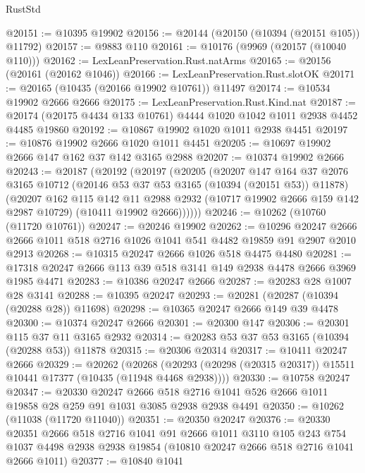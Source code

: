 \begin{lexlean}{RustStd}
\begin{coremodule}
@20151 := @10395 @19902
@20156 := @20144 (@20150 (@10394 (@20151 @105)) @11792)
@20157 := @9883 @110
@20161 := @10176 (@9969 (@20157 (@10040 @110)))
@20162 := LexLeanPreservation.Rust.natArms
@20165 := @20156 (@20161 (@20162 @1046))
@20166 := LexLeanPreservation.Rust.slotOK
@20171 := @20165 (@10435 (@20166 @19902 @10761)) @11497
@20174 := @10534 @19902 @2666 @2666
@20175 := LexLeanPreservation.Rust.Kind.nat
@20187 := @20174 (@20175 @4434 @133 @10761) @4444 @1020 @1042 @1011 @2938 @4452 @4485 @19860
@20192 := @10867 @19902 @1020 @1011 @2938 @4451
@20197 := @10876 @19902 @2666 @1020 @1011 @4451
@20205 := @10697 @19902 @2666 @147 @162 @37 @142 @3165 @2988
@20207 := @10374 @19902 @2666
@20243 := @20187
    (@20192
      (@20197
        (@20205
          (@20207
            @147
            @164
            @37
            @2076
            @3165
            @10712
            (@20146 @53 @37 @53 @3165 (@10394 (@20151 @53)) @11878)
            (@20207
              @162
              @115
              @142
              @11
              @2988
              @2932
              (@10717 @19902 @2666 @159 @142 @2987 @10729)
              (@10411 @19902 @2666))))))
@20246 := @10262 (@10760 (@11720 @10761))
@20247 := @20246 @19902
@20262 := @10296
    @20247
    @2666
    @2666
    @1011
    @518
    @2716
    @1026
    @1041
    @541
    @4482
    @19859
    @91
    @2907
    @2010
    @2913
@20268 := @10315 @20247 @2666 @1026 @518 @4475 @4480
@20281 := @17318 @20247 @2666 @113 @39 @518 @3141 @149 @2938 @4478 @2666 @3969 @1985 @4471
@20283 := @10386 @20247 @2666
@20287 := @20283 @28 @1007 @28 @3141
@20288 := @10395 @20247
@20293 := @20281 (@20287 (@10394 (@20288 @28)) @11698)
@20298 := @10365 @20247 @2666 @149 @39 @4478
@20300 := @10374 @20247 @2666
@20301 := @20300 @147
@20306 := @20301 @115 @37 @11 @3165 @2932
@20314 := @20283 @53 @37 @53 @3165 (@10394 (@20288 @53)) @11878
@20315 := @20306 @20314
@20317 := @10411 @20247 @2666
@20329 := @20262
    (@20268 (@20293 (@20298 (@20315 @20317)) @15511 @10441 @17377 (@10435 (@11948 @4468 @2938))))
@20330 := @10758 @20247
@20347 := @20330
    @20247
    @2666
    @518
    @2716
    @1041
    @526
    @2666
    @1011
    @19858
    @28
    @259
    @91
    @1031
    @3085
    @2938
    @2938
    @4491
@20350 := @10262 (@11038 (@11720 @11040))
@20351 := @20350 @20247
@20376 := @20330
    @20351
    @2666
    @518
    @2716
    @1041
    @91
    @2666
    @1011
    @3110
    @105
    @243
    @754
    @1037
    @4498
    @2938
    @2938
    @19854
    (@10810 @20247 @2666 @518 @2716 @1041 @2666 @1011)
@20377 := @10840 @1041

\end{coremodule}
\end{lexlean}
